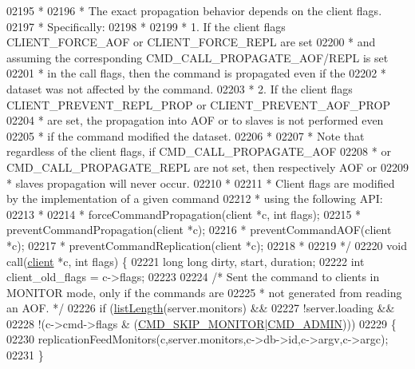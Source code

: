 \begin{DoxyCode}
{{{{{{{{{{{{{{{{{{{{{{{{{{{{{02195 \textcolor{comment}{ *}
02196 \textcolor{comment}{ * The exact propagation behavior depends on the client flags.}
02197 \textcolor{comment}{ * Specifically:}
02198 \textcolor{comment}{ *}
02199 \textcolor{comment}{ * 1. If the client flags CLIENT\_FORCE\_AOF or CLIENT\_FORCE\_REPL are set}
02200 \textcolor{comment}{ *    and assuming the corresponding CMD\_CALL\_PROPAGATE\_AOF/REPL is set}
02201 \textcolor{comment}{ *    in the call flags, then the command is propagated even if the}
02202 \textcolor{comment}{ *    dataset was not affected by the command.}
02203 \textcolor{comment}{ * 2. If the client flags CLIENT\_PREVENT\_REPL\_PROP or CLIENT\_PREVENT\_AOF\_PROP}
02204 \textcolor{comment}{ *    are set, the propagation into AOF or to slaves is not performed even}
02205 \textcolor{comment}{ *    if the command modified the dataset.}
02206 \textcolor{comment}{ *}
02207 \textcolor{comment}{ * Note that regardless of the client flags, if CMD\_CALL\_PROPAGATE\_AOF}
02208 \textcolor{comment}{ * or CMD\_CALL\_PROPAGATE\_REPL are not set, then respectively AOF or}
02209 \textcolor{comment}{ * slaves propagation will never occur.}
02210 \textcolor{comment}{ *}
02211 \textcolor{comment}{ * Client flags are modified by the implementation of a given command}
02212 \textcolor{comment}{ * using the following API:}
02213 \textcolor{comment}{ *}
02214 \textcolor{comment}{ * forceCommandPropagation(client *c, int flags);}
02215 \textcolor{comment}{ * preventCommandPropagation(client *c);}
02216 \textcolor{comment}{ * preventCommandAOF(client *c);}
02217 \textcolor{comment}{ * preventCommandReplication(client *c);}
02218 \textcolor{comment}{ *}
02219 \textcolor{comment}{ */}
02220 \textcolor{keywordtype}{void} call(\hyperlink{structclient}{client} *c, \textcolor{keywordtype}{int} flags) \{
02221     \textcolor{keywordtype}{long} \textcolor{keywordtype}{long} dirty, start, duration;
02222     \textcolor{keywordtype}{int} client\_old\_flags = c->flags;
02223 
02224     \textcolor{comment}{/* Sent the command to clients in MONITOR mode, only if the commands are}
02225 \textcolor{comment}{     * not generated from reading an AOF. */}
02226     \textcolor{keywordflow}{if} (\hyperlink{adlist_8h_afde0ab079f934670e82119b43120e94b}{listLength}(server.monitors) &&
02227         !server.loading &&
02228         !(c->cmd->flags & (\hyperlink{server_8h_a43e2aecb49a88a6cd4e56bfa971bdc71}{CMD\_SKIP\_MONITOR}|\hyperlink{server_8h_a1917805ea3942a4784ec806c33bc6033}{CMD\_ADMIN})))
02229     \{
02230         replicationFeedMonitors(c,server.monitors,c->db->id,c->argv,c->argc);
02231     \}
}}}}}}}}}}}}}}}}}}}}}}}}}}}}}
\end{DoxyCode}
